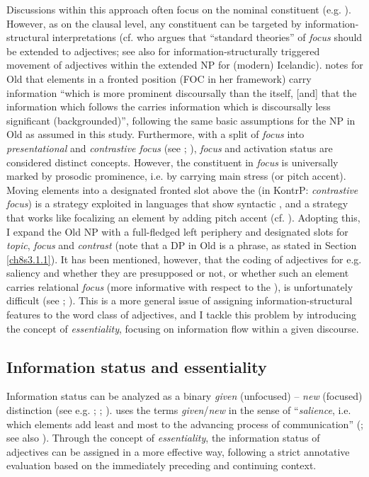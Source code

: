 \documentclass[output=paper,colorlinks,citecolor=brown]{langscibook}
\begin{document}
Discussions within this approach often focus on the nominal constituent
(e.g. \citealp[142]{IsacKirk2008}). However, as on the clausal level, any
constituent can be targeted by information-structural interpretations
(cf. \citealp{Truswell2004} who argues that ``standard theories'' of \emph{focus}
should be extended to adjectives; see also \citealp[103f]{Hardarson2017} for
information-structurally triggered movement of adjectives within the
extended NP for (modern) Icelandic). \citet[92]{Harries2014} notes for Old
 that elements in a fronted position (FOC in her framework) carry
information ``which is more prominent discoursally than the  itself,
{[}and{]} that the information which follows the  carries
information which is discoursally less significant (backgrounded)'',
following the same basic assumptions for the NP in Old  as assumed
in this study. Furthermore, with a split of \emph{focus} into
\emph{presentational} and \emph{contrastive focus} (see \citealp{chafe1976givenness}; \citealp{KatzSelkirk2011}), \emph{focus} and activation status are considered
distinct concepts. However, the constituent in \emph{focus} is
universally marked by prosodic prominence, i.e. by carrying main stress
(or pitch accent). Moving elements into a designated fronted slot above
the  (in KontrP: \emph{contrastive focus}) is a strategy exploited
in languages that show syntactic , and a strategy that works
like focalizing an element by adding pitch accent (cf. \citealp{CorvervanKoppen2009}). Adopting this, I expand the Old  NP with a
full-fledged left periphery and designated slots for \emph{topic},
\emph{focus} and \emph{contrast} (note that a DP in Old  is a
 phrase, as stated in Section \ref{ch8s3.1.1}). It has been mentioned, however,
that the coding of adjectives for e.g. saliency and whether they are
presupposed or not, or whether such an element carries relational
\emph{focus} (more informative with respect to the ), is
unfortunately difficult (see \citealp[13]{vanGelderenLohndal2008}; \citealp[259f]{Allen12}). This is a more general issue of assigning
information-structural features to the word class of adjectives, and 
I tackle this problem by introducing the concept of
\emph{essentiality}, focusing on information flow within a given discourse.

\subsection{Information status and essentiality}\label{ch8s3.4}
Information status can be analyzed as a binary \emph{given} (unfocused)
-- \emph{new} (focused) distinction (see e.g. \citealp{Prince1981}; \citealp{GundelHedbergZacharski1993}; \citealp{Birner2006}). \citet[256]{Fischer06} uses the terms
\emph{given}/\emph{new} in the sense of ``\emph{salience}, i.e. which
elements add least and most to the advancing process of communication''
(\citealp[25]{Bech19}; see also \citealp[122]{FischervanderWurff2006}). Through
the concept of \emph{essentiality}, the information status of adjectives
can be assigned in a more effective way, following a strict annotative
evaluation based on the immediately preceding and continuing context.
\end{document}
